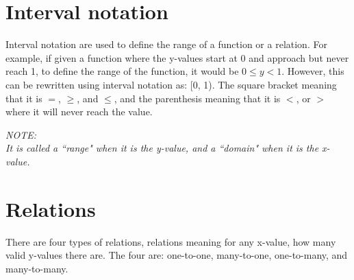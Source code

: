 \documentclass{book}
\newenvironment{note}{\begin{center}\em NOTE:\\}{\end{center}}
\begin{document}
\section{Interval notation}
Interval notation are used to define the range of a function or a relation.  For example, if given a function where the y-values start at 0 and approach but never reach 1, to define the range of the function, it would be $0 \leq y < 1$.  However, this can be rewritten using interval notation as: [0, 1).  The square bracket meaning that it is $=$, $\geq$, and $\leq$, and the parenthesis meaning that it is $<$, or $>$ where it will never reach the value.\\
\begin{note}
	It is called a ``range" when it is the y-value, and a ``domain" when it is the x-value.
\end{note}

\section{Relations}
There are four types of relations, relations meaning for any x-value, how many valid y-values there are.  The four are: one-to-one, many-to-one, one-to-many, and many-to-many.\\
\end{document}
